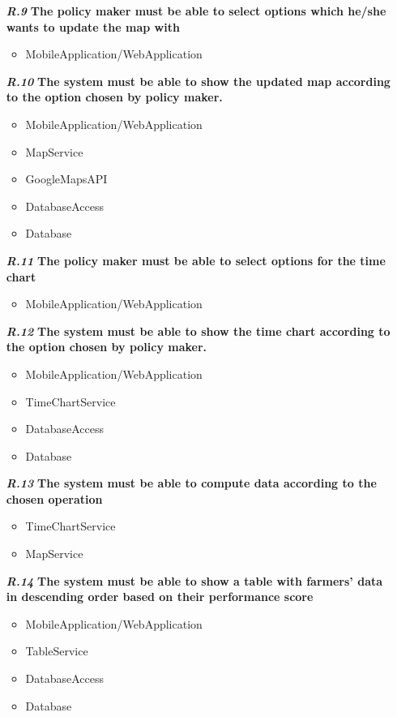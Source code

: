 \begin{itemize}
\item[\textbf{\textit{R.9}}] \textbf{The policy maker must be able to select options which he/she wants to update the map with}
   \begin{itemize}
     \item MobileApplication/WebApplication
\end{itemize}    

\item [\textbf{\textit{R.10}}] \textbf{The system must be able to show the updated map according to the option chosen by policy maker.}
   \begin{itemize}
     \item MobileApplication/WebApplication
     \item MapService
     \item GoogleMapsAPI
     \item DatabaseAccess
     \item Database
\end{itemize}    

\item [\textbf{\textit{R.11}}] \textbf{The policy maker must be able to select options for the time chart}
\begin{itemize}
     \item MobileApplication/WebApplication
\end{itemize}    
  
\item [\textbf{\textit{R.12}}] \textbf{The system must be able to show the time chart according to the option chosen by policy maker.}
   \begin{itemize}
     \item MobileApplication/WebApplication
     \item TimeChartService
     \item DatabaseAccess
     \item Database
\end{itemize}    

\item [\textbf{\textit{R.13}}]\textbf{The system must be able to compute data according to the chosen operation}
    \begin{itemize}
     \item TimeChartService
     \item MapService
\end{itemize}    

\item [\textbf{\textit{R.14}}] \textbf{The system must be able to show a table with farmers' data in descending order based on their performance score}
   \begin{itemize}
     \item MobileApplication/WebApplication
     \item TableService
     \item DatabaseAccess
     \item Database
\end{itemize}    


\end{itemize}
